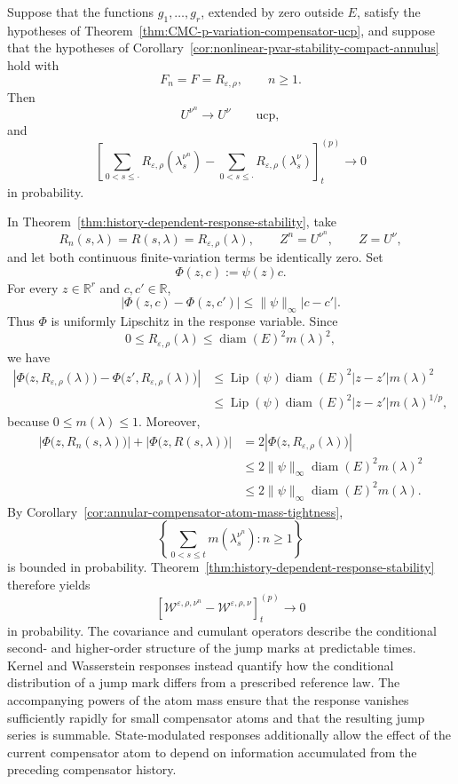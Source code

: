 \documentclass[a4paper,10pt]{article}
\begin{document}
Suppose that the functions \(g_1,\ldots,g_r\), extended by zero
outside \(E\), satisfy the hypotheses of
Theorem~\ref{thm:CMC-p-variation-compensator-ucp}, and suppose that the hypotheses of
Corollary~\ref{cor:nonlinear-pvar-stability-compact-annulus}
hold with
\[
        F_n=F=R_{\varepsilon,\rho},
        \qquad n\ge1.
\]
Then
\[
U^{\nu^n}\longrightarrow U^\nu
\qquad\text{ucp},
\]
and
\[
\left[
\sum_{0<s\le\cdot}
R_{\varepsilon,\rho}(\lambda_s^{\nu^n})
-
\sum_{0<s\le\cdot}
R_{\varepsilon,\rho}(\lambda_s^\nu)
\right]^{(p)}_t
\longrightarrow0
\]
in probability.

In Theorem~\ref{thm:history-dependent-response-stability}, take
\[
R_n(s,\lambda)
=
R(s,\lambda)
=
R_{\varepsilon,\rho}(\lambda),
\qquad
Z^n=U^{\nu^n},
\qquad
Z=U^\nu,
\]
and let both continuous finite-variation terms be identically zero.
Set
\[
        \Phi(z,c):=\psi(z)c.
\]
For every \(z\in\mathbb R^r\) and \(c,c'\in\mathbb R\),
\[
\left|
\Phi(z,c)-\Phi(z,c')
\right|
\le
\lVert\psi\rVert_\infty|c-c'|.
\]
Thus \(\Phi\) is uniformly Lipschitz in the response variable. Since
\[
0\le
R_{\varepsilon,\rho}(\lambda)
\le
\operatorname{diam}(E)^2m(\lambda)^2,
\]
we have
\[
\begin{aligned}
\left|
\Phi\bigl(z,R_{\varepsilon,\rho}(\lambda)\bigr)
-
\Phi\bigl(z',R_{\varepsilon,\rho}(\lambda)\bigr)
\right|
&\le
\operatorname{Lip}(\psi)
\operatorname{diam}(E)^2
|z-z'|m(\lambda)^2
\\
&\le
\operatorname{Lip}(\psi)
\operatorname{diam}(E)^2
|z-z'|m(\lambda)^{1/p},
\end{aligned}
\]
because \(0\le m(\lambda)\le1\). Moreover,
\[
\begin{aligned}
\left|
\Phi\bigl(z,R_n(s,\lambda)\bigr)
\right|
+
\left|
\Phi\bigl(z,R(s,\lambda)\bigr)
\right|
&=
2\left|
\Phi\bigl(z,R_{\varepsilon,\rho}(\lambda)\bigr)
\right|
\\
&\le
2\lVert\psi\rVert_\infty
\operatorname{diam}(E)^2m(\lambda)^2
\\
&\le
2\lVert\psi\rVert_\infty
\operatorname{diam}(E)^2m(\lambda).
\end{aligned}
\]
By
Corollary~\ref{cor:annular-compensator-atom-mass-tightness},
\[
\left\{
        \sum_{0<s\le t}m(\lambda_s^{\nu^n})
        :
        n\ge1
\right\}
\]
is bounded in probability.
Theorem~\ref{thm:history-dependent-response-stability} therefore
yields
\[
\left[
\mathcal W^{\varepsilon,\rho,\nu^n}
-
\mathcal W^{\varepsilon,\rho,\nu}
\right]^{(p)}_t
\longrightarrow0
\]
in probability.
The covariance and cumulant operators describe the conditional
second- and higher-order structure of the jump marks at predictable
times. Kernel and Wasserstein responses instead quantify how the
conditional distribution of a jump mark differs from a prescribed
reference law. The accompanying powers of the atom mass ensure that
the response vanishes sufficiently rapidly for small compensator
atoms and that the resulting jump series is summable. State-modulated
responses additionally allow the effect of the current compensator
atom to depend on information accumulated from the preceding
compensator history.
\end{document}
